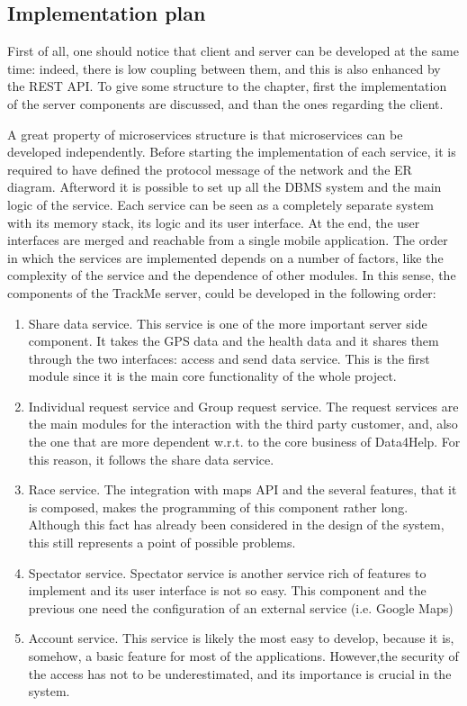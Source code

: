 \subsection{Implementation plan}
First of all, one should notice that client and server can be developed at the same time: indeed, there is low coupling
between them, and this is also enhanced by the REST API. 
To give some structure to the chapter, first the implementation of the server components are discussed, and than the ones regarding the client. \\ 
\par 
A great property of microservices structure is that microservices can be developed independently. Before starting the implementation of each service, it is required to have defined the protocol message of the network and the ER diagram.
Afterword it is possible to set up all the DBMS system and the main logic of the service. 
Each service can be seen as a completely separate system with its memory stack, its logic and its user
interface. 
At the end, the user interfaces are merged and reachable from a single mobile application. 
The order in which the services are implemented depends on a number of factors, like the complexity of the
service and the dependence of other modules. 
In this sense, the components of the TrackMe server, could be developed in the following order:
 \begin{enumerate}
\item Share data service.
This service is one of the more important server side component. It takes the GPS data and the health data
and it shares them through the two interfaces: access and send data service. 
This is the first module since it is the main core functionality of the whole project. 
\item Individual request service and Group request service.
The request services are the main modules for the interaction with the third party customer, and, also
the one that are more dependent w.r.t. to the core business of Data4Help. For this reason, it follows 
the share data service.
\item Race service.
The integration with maps API and the several features, that it is composed, makes the programming of this
component rather long. Although this fact has already been considered in the design of the system, this
still represents a point of possible problems.
\item Spectator service.
Spectator service is another service rich of features to implement and its user interface is not so easy.  
This component and the previous one need the configuration of an external service (i.e. Google Maps) 
\item Account service. 
This service is likely the most easy to develop, because it is, somehow, a basic feature for most of the
applications. 
However,the security of the access has not to be underestimated, and its importance is crucial in the
system.
\end{enumerate}   
